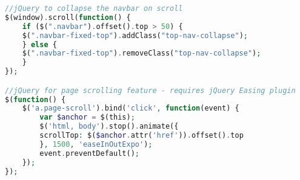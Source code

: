 \begin{lstlisting}[language=PHP,basicstyle=\tiny,caption=scrolling-nav.js]
//jQuery to collapse the navbar on scroll
$(window).scroll(function() {
	if ($(".navbar").offset().top > 50) {
	$(".navbar-fixed-top").addClass("top-nav-collapse");
	} else {
	$(".navbar-fixed-top").removeClass("top-nav-collapse");
	}
});

//jQuery for page scrolling feature - requires jQuery Easing plugin
$(function() {
	$('a.page-scroll').bind('click', function(event) {
		var $anchor = $(this);
		$('html, body').stop().animate({
		scrollTop: $($anchor.attr('href')).offset().top
		}, 1500, 'easeInOutExpo');
		event.preventDefault();
	});
});

\end{lstlisting}